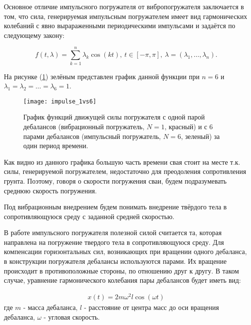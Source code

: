 Основное отличие импульсного погружателя от вибропогружателя заключается в том, что сила, генерируемая
импульсным погружателем имеет вид гармонических колебаний с явно вырараженными периодическими импульсами и задаётся
по следующему закону:

\begin{equation}
    f(t,\lambda)=\sum_{k=1}^n \lambda_k\cos(kt),\ t\in [-\pi,\pi],\ \lambda =(\lambda_1, \ldots,\lambda_n).
\end{equation}

\noindent На рисунке (\ref{fig:impulse_1vs6}) зелёным представлен график данной функции при $n = 6$ и
$\lambda_1 = \lambda_2 = \ldots = \lambda_6 = 1$.

\begin{figure}[ht]
    \centering
    \texttt{[image: impulse\_1vs6]}
    \caption{График функций движущей силы погружателя с одной парой дебалансов (вибрационный погружатель, $N = 1$, красный) и с 6 парами дебалансов (импульсный погружатель, $N = 6$, зеленый) за один период времени.}
    \label{fig:impulse_1vs6}
\end{figure}

\noindent Как видно из данного графика большую часть времени свая стоит на месте т.к. силы, генерируемой погружателем,
недостаточно для преодоления сопротивления грунта. Поэтому, говоря о скорости погружения сваи, будем подразумевать среднюю
скорость погружения.

\begin{definition}
    Под вибрационным внедрением будем понимать внедрение твёрдого тела в сопротивляющуюся среду с заданной
    средней скоростью.
\end{definition}

В работе импульсного погружателя полезной силой считается та, которая направлена на погружение твердого тела в
сопротивляющуюся среду. Для компенсации горизонтальных сил, возникающих при вращении одного дебаланса,
в конструкции погружателя дебалансы используются парами. Их вращение происходит в противоположные стороны, по отношению друг
к другу. В таком случае, уравнение гармонического колебания пары дебалансов будет иметь вид:

\begin{equation}
    \begin{aligned}
        x(t) = 2 m \omega^2 l \cos (\omega t)
    \end{aligned}
\end{equation}
\noindent где $m$ - масса дебаланса, $l$ - расстояние от центра масс до оси вращения дебаланса, $\omega$ - угловая скорость.

